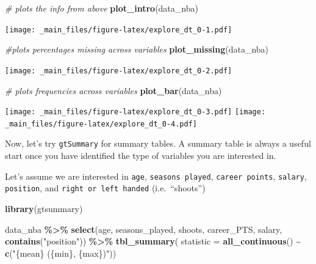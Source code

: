 \documentclass[
]{book}
\newenvironment{Shaded}{\begin{snugshade}}{\end{snugshade}}
\newcommand{\AttributeTok}[1]{\textcolor[rgb]{0.13,0.29,0.53}{#1}}
\newcommand{\CommentTok}[1]{\textcolor[rgb]{0.56,0.35,0.01}{\textit{#1}}}
\newcommand{\FunctionTok}[1]{\textcolor[rgb]{0.13,0.29,0.53}{\textbf{#1}}}
\newcommand{\NormalTok}[1]{#1}
\newcommand{\SpecialCharTok}[1]{\textcolor[rgb]{0.81,0.36,0.00}{\textbf{#1}}}
\newcommand{\StringTok}[1]{\textcolor[rgb]{0.31,0.60,0.02}{#1}}
\begin{document}
\begin{Shaded}
\begin{Highlighting}[]
\CommentTok{\# plots the info from above}
\FunctionTok{plot\_intro}\NormalTok{(data\_nba)}
\end{Highlighting}
\end{Shaded}

\texttt{[image: \_main\_files/figure-latex/explore\_dt\_0-1.pdf]}

\begin{Shaded}
\begin{Highlighting}[]
\CommentTok{\#plots percentages missing across variables}
\FunctionTok{plot\_missing}\NormalTok{(data\_nba)}
\end{Highlighting}
\end{Shaded}

\texttt{[image: \_main\_files/figure-latex/explore\_dt\_0-2.pdf]}

\begin{Shaded}
\begin{Highlighting}[]
\CommentTok{\# plots frequencies across variables}
\FunctionTok{plot\_bar}\NormalTok{(data\_nba)}
\end{Highlighting}
\end{Shaded}

\texttt{[image: \_main\_files/figure-latex/explore\_dt\_0-3.pdf]} \texttt{[image: \_main\_files/figure-latex/explore\_dt\_0-4.pdf]}

Now, let's try \texttt{gtSummary} for summary tables. A summary table is always a useful start once you have identified the type of variables you are interested in.

Let's assume we are interested in \texttt{age}, \texttt{seasons\ played}, \texttt{career\ points}, \texttt{salary}, \texttt{position}, and \texttt{right\ or\ left\ handed} (i.e.~``shoots'')

\begin{Shaded}
\begin{Highlighting}[]
\FunctionTok{library}\NormalTok{(gtsummary)}

\NormalTok{data\_nba }\SpecialCharTok{\%\textgreater{}\%} 
  \FunctionTok{select}\NormalTok{(age, seasons\_played, shoots, career\_PTS, salary, }\FunctionTok{contains}\NormalTok{(}\StringTok{"position"}\NormalTok{)) }\SpecialCharTok{\%\textgreater{}\%}
         \FunctionTok{tbl\_summary}\NormalTok{(}
           \AttributeTok{statistic =} \FunctionTok{all\_continuous}\NormalTok{() }\SpecialCharTok{\textasciitilde{}} \FunctionTok{c}\NormalTok{(}\StringTok{"\{mean\} (\{min\}, \{max\})"}\NormalTok{)) }
\end{Highlighting}
\end{Shaded}
\end{document}
